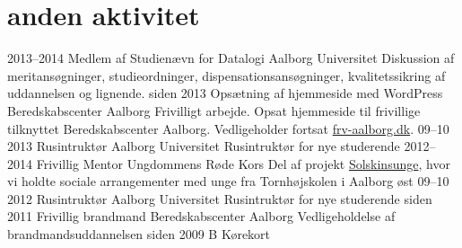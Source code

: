 \documentclass[]{friggeri-cv}
\begin{document}
\section{anden aktivitet}

\begin{entrylist}
  \entry
  {2013–2014}
  {Medlem af Studienævn for Datalogi}
  {Aalborg Universitet}
  {Diskussion af meritansøgninger, studieordninger, dispensationsansøgninger, kvalitetssikring af uddannelsen og lignende.}
  \entry
  {siden 2013}
  {Opsætning af hjemmeside med WordPress}
  {Beredskabscenter Aalborg}
  {Frivilligt arbejde. Opsat hjemmeside til frivillige tilknyttet Beredskabscenter Aalborg.
  Vedligeholder fortsat \href{http://frv-aalborg.dk}{frv-aalborg.dk}.}
  \entry
  {09–10 2013}
  {Rusintruktør}
  {Aalborg Universitet}
  {Rusintruktør for nye studerende}
  \entry
  {2012–2014}
  {Frivillig Mentor }
  {Ungdommens Røde Kors}
  {Del af projekt \href{http://www.urk.dk/solskinsunge/}{Solskinsunge}, hvor vi holdte sociale arrangementer med unge fra Tornhøjskolen i Aalborg øst}
  \entry
  {09–10 2012}
  {Rusintruktør}
  {Aalborg Universitet}
  {Rusintruktør for nye studerende}
  \entry
  {siden 2011}
  {Frivillig brandmand}
  {Beredskabscenter Aalborg}
  {Vedligeholdelse af brandmandsuddannelsen}
  \entry
  {siden 2009}
  {B Kørekort}
  {}{}
\end{entrylist}
\end{document}
